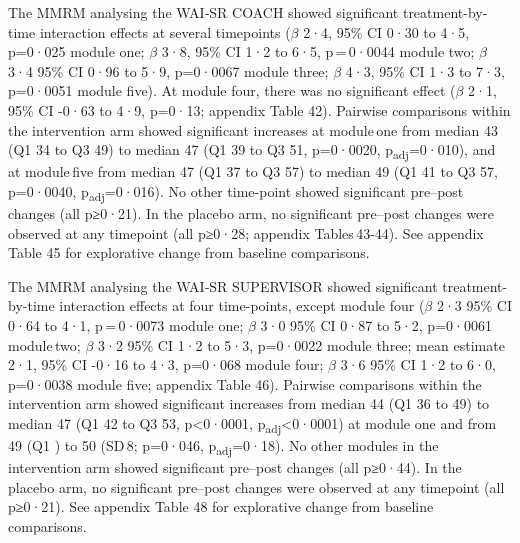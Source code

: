\documentclass[
  super,
  preprint,
  1p,
  onecolumn]{elsarticle}
\begin{document}
The MMRM analysing the WAI‑SR COACH showed significant treatment-by-time
interaction effects at several timepoints (\(\beta\) 2·4, 95\% CI 0·30
to 4·5, p=0·025 module one; \(\beta\) 3·8, 95\% CI 1·2 to 6·5,
p\,=\,0·0044 module two; \(\beta\) 3·4 95\% CI 0·96 to 5·9, p=0·0067
module three; \(\beta\) 4·3, 95\% CI 1·3 to 7·3, p=0·0051 module five).
At module four, there was no significant effect (\(\beta\) 2·1, 95\% CI
-0·63 to 4·9, p=0·13; appendix Table 42). Pairwise comparisons within
the intervention arm showed significant increases at module\,one from
median 43 (Q1 34 to Q3 49) to median 47 (Q1 39 to Q3 51, p=0·0020,
p\textsubscript{adj}=0·010), and at module\,five from median 47 (Q1 37
to Q3 57) to median 49 (Q1 41 to Q3 57, p=0·0040,
p\textsubscript{adj}=0·016). No other time-point showed significant
pre--post changes (all p≥0·21). In the placebo arm, no significant
pre--post changes were observed at any timepoint (all p≥0·28; appendix
Tables\,43-44). See appendix Table 45 for explorative change from
baseline comparisons.

The MMRM analysing the WAI‑SR SUPERVISOR showed significant
treatment-by-time interaction effects at four time-points, except module
four (\(\beta\) 2·3 95\% CI 0·64 to 4·1, p\,=\,0·0073 module one;
\(\beta\) 3·0 95\% CI 0·87 to 5·2, p=0·0061 module\,two; \(\beta\) 3·2
95\% CI 1·2 to 5·3, p=0·0022 module three; mean estimate 2·1, 95\% CI
-0·16 to 4·3, p=0·068 module four; \(\beta\) 3·6 95\% CI 1·2 to 6·0,
p=0·0038 module five; appendix Table 46). Pairwise comparisons within
the intervention arm showed significant increases from median 44 (Q1 36
to 49) to median 47 (Q1 42 to Q3 53, p\textless0·0001,
p\textsubscript{adj}\textless0·0001) at module one and from 49 (Q1 ) to
50 (SD\,8; p=0·046, p\textsubscript{adj}=0·18). No other modules in the
intervention arm showed significant pre--post changes (all p≥0·44). In
the placebo arm, no significant pre--post changes were observed at any
timepoint (all p≥0·21). See appendix Table 48 for explorative change
from baseline comparisons.

\newpage{}
\end{document}
